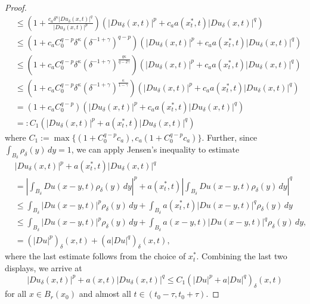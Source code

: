 \documentclass[10pt,a4paper]{amsart}
\numberwithin{equation}{section}
\begin{document}
\begin{proof}
\begin{align*}
 & \leq\left(1+\frac{c_a \delta^{\kappa} \left|Du_{\delta}(x,t)\right|^{q}}{\left|Du_{\delta}(x,t)\right|^{p}}\right)\left(\left|Du_{\delta}(x,t)\right|^{p}+c_a a(x_{t}^{\ast},t)\left|Du_{\delta}(x,t)\right|^{q}\right)\nonumber \\
 & \leq\left(1+c_a C^{q-p}_0\delta^{\kappa}\left(\delta^{-1+\gamma}\right)^{q-p}\right)\left(\left|Du_{\delta}(x,t)\right|^{p}+c_a a(x_{t}^{\ast},t)\left|Du_{\delta}(x,t)\right|^{q}\right)\nonumber \\
 &\leq \left(1+c_a C^{q-p}_0 \delta^{\kappa}\left(\delta^{-1+\gamma}\right)^{\frac{q\kappa}{q-2\gamma}}\right)\left(\left|Du_{\delta}(x,t)\right|^{p}+c_a a(x_{t}^{\ast},t)\left|Du_{\delta}(x,t)\right|^{q}\right)\nonumber \\
 &\leq \left(1+c_a C^{q-p}_0 \delta^{\kappa}\left(\delta^{-1+\gamma}\right)^{\frac{\kappa}{1-\gamma}}\right)\left(\left|Du_{\delta}(x,t)\right|^{p}+c_a a(x_{t}^{\ast},t)\left|Du_{\delta}(x,t)\right|^{q}\right)\nonumber \\
 & =\left(1+c_a C^{q-p}_0\right)\left(\left|Du_{\delta}(x,t)\right|^{p}+c_a a(x_{t}^{\ast},t)\left|Du_{\delta}(x,t)\right|^{q}\right)\nonumber \\
 & =:C_{1}\left(\left|Du_{\delta}(x,t)\right|^{p}+a(x_{t}^{\ast},t)\left|Du_{\delta}(x,t)\right|^{q}\right)
\end{align*}
where $C_1:=\max\{(1+C^{q-p}_0 c_a), c_a(1+C^{q-p}_0 c_a)\}.$
Further, since $\int_{B_{\delta}}\rho_{\delta}(y)\, dy=1$, we can apply Jensen's inequality to estimate
\begin{align*}
 & \left|Du_{\delta}(x,t)\right|^{p}+a(x_{t}^{\ast},t)\left|Du_{\delta}(x,t)\right|^{q}\\
 & =\left|\int_{B_{\delta}}Du(x-y,t)\rho_{\delta}(y)\, d y\right|^{p}+a(x_{t}^{\ast},t)\left|\int_{B_{\delta}}Du\left(x-y,t\right)\rho_{\delta}(y)\, d y\right|^{q}\\
 & \leq\int_{B_{\delta}}\left|Du(x-y,t)\right|^{p}\rho_{\delta}(y)\, dy+\int_{B_{\delta}}a(x_{t}^{\ast},t)\left|Du\left(x-y,t\right)\right|^{q}\rho_{\delta}(y)\, dy\\
 & \leq\int_{B_{\delta}}\left|Du(x-y,t)\right|^{p}\rho_{\delta}(y)\, d y+\int_{B_{\delta}}a(x-y,t)\left|Du\left(x-y,t\right)\right|^{q}\rho_{\delta}(y)\, d y,\\
 & =(\left|Du\right|^{p})_{\delta}(x,t)+(a\left|Du\right|^{q})_{\delta}(x,t),
\end{align*}
where the last estimate follows from the choice of $x_{t}^{\ast}$. Combining the last two displays, we arrive at
\begin{equation}
\left|Du_{\delta}(x,t)\right|^{p}+a(x,t)\left|Du_{\delta}(x,t)\right|^{q}\leq C_{1}(\left|Du\right|^{p}+a\left|Du\right|^{q})_{\delta}(x,t)\label{eq:space approx 4-1}
\end{equation}
for all $x\in B_{r}(x_0)$ and almost all $t\in(t_0-\tau, t_0+\tau)$.


\end{proof}
\end{document}
